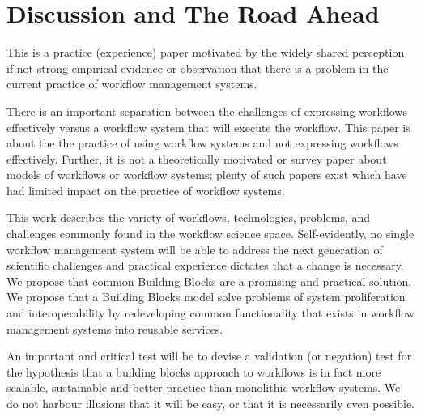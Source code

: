 \section{Discussion and The Road Ahead}\label{discussion}

This is a practice (experience) paper motivated by the widely shared
perception if not strong empirical evidence or observation that there is a
problem in the current practice of workflow management systems.

There is an important separation between the challenges of expressing workflows
effectively versus a workflow system that will execute the
workflow. This paper is about the  the practice of using workflow
systems and not expressing workflows effectively. Further, it is not a
theoretically motivated or survey paper about models of workflows or workflow
systems; plenty of such papers exist which have had limited impact on the
practice of workflow systems. 

This work describes the variety of workflows, technologies, problems, and
challenges commonly found in the workflow science space.  Self-evidently, no
single workflow management system will be able to address the next generation
of scientific challenges and practical experience dictates that a change is
necessary. We propose  that common Building Blocks are a promising and
practical solution. We propose that a Building Blocks model solve problems of
system proliferation and interoperability by redeveloping common functionality
that exists in workflow management systems into reusable services.

An important and critical test will be to devise a validation (or negation)
test for the hypothesis that a building blocks approach to workflows is in fact
more scalable, sustainable and better practice than monolithic workflow
systems. We do not harbour illusions that it will be easy, or that it is
necessarily even possible.


